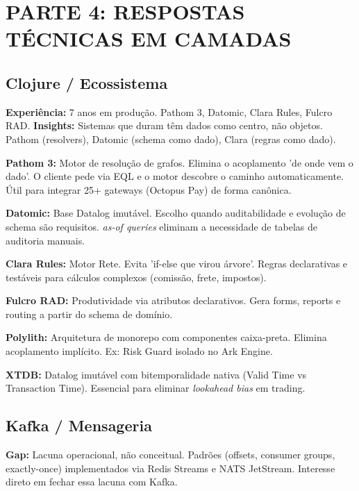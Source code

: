 \documentclass[10pt,a4paper]{article}
\begin{document}
\section*{PARTE 4: RESPOSTAS TÉCNICAS EM CAMADAS}

\subsection*{Clojure / Ecossistema}
\textbf{Experiência:} 7 anos em produção. Pathom 3, Datomic, Clara Rules, Fulcro RAD.
\textbf{Insights:} Sistemas que duram têm dados como centro, não objetos. Pathom (resolvers), Datomic (schema como dado), Clara (regras como dado).

\textbf{Pathom 3:} Motor de resolução de grafos. Elimina o acoplamento 'de onde vem o dado'. O cliente pede via EQL e o motor descobre o caminho automaticamente. Útil para integrar 25+ gateways (Octopus Pay) de forma canônica.

\textbf{Datomic:} Base Datalog imutável. Escolho quando auditabilidade e evolução de schema são requisitos. \textit{as-of queries} eliminam a necessidade de tabelas de auditoria manuais.

\textbf{Clara Rules:} Motor Rete. Evita 'if-else que virou árvore'. Regras declarativas e testáveis para cálculos complexos (comissão, frete, impostos).

\textbf{Fulcro RAD:} Produtividade via atributos declarativos. Gera forms, reports e routing a partir do schema de domínio.

\textbf{Polylith:} Arquitetura de monorepo com componentes caixa-preta. Elimina acoplamento implícito. Ex: Risk Guard isolado no Ark Engine.

\textbf{XTDB:} Datalog imutável com bitemporalidade nativa (Valid Time vs Transaction Time). Essencial para eliminar \textit{lookahead bias} em trading.

\subsection*{Kafka / Mensageria}
\textbf{Gap:} Lacuna operacional, não conceitual. Padrões (offsets, consumer groups, exactly-once) implementados via Redis Streams e NATS JetStream. Interesse direto em fechar essa lacuna com Kafka.
\end{document}
